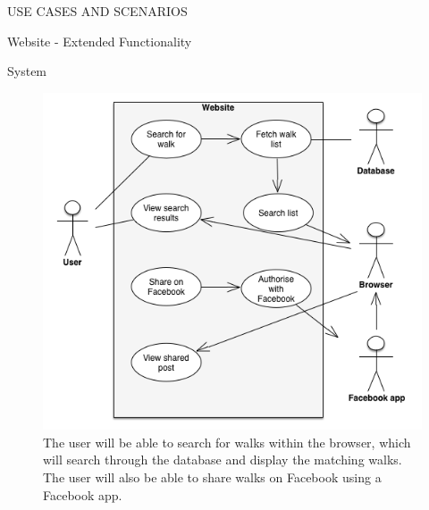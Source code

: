 \documentclass{article}
\begin{document}
\begin{section}{USE CASES AND SCENARIOS}
		\clearpage
		\begin{subsection}{Website - Extended Functionality}
			\begin{subsubsection}{System}
				\begin{figure}[h!]
					\begin{center}
						\includegraphics[height=0.75\columnwidth]{../Diagrams/UseCase/Website/Extended/Website.png}
					\end{center}
					\caption{The user will be able to search for walks within the browser, which will search through the database and display the matching walks. The user will also be able to share walks on Facebook using a Facebook app.}
				\end{figure}
			\end{subsubsection}
		\end{subsection}
	\end{section}
	
\end{document}
